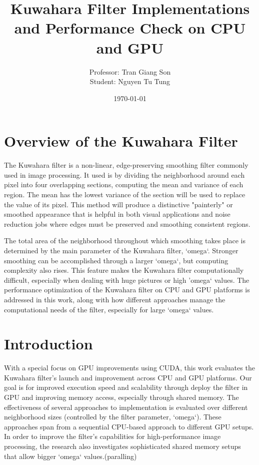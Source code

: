 \documentclass{article}
\title{Kuwahara Filter Implementations and Performance Check on CPU and GPU}
\author{
Professor: Tran Giang Son
\\
Student: Nguyen Tu Tung}
\date{\today}
\begin{document}
\maketitle

\section{Overview of the Kuwahara Filter}
The Kuwahara filter is a non-linear, edge-preserving smoothing filter commonly used in image processing. It used is by dividing the neighborhood around each pixel into four overlapping sections, computing the mean and variance of each region. The mean has the lowest variance of the section will be used to replace the value of its pixel. This method will produce a distinctive "painterly" or smoothed appearance that is helpful in both visual applications and noise reduction jobs where edges must be preserved and smoothing consistent regions.

The total area of the neighborhood throughout which smoothing takes place is determined by the main parameter of the Kuwahara filter, `omega`. Stronger smoothing can be accomplished through a larger `omega`, but computing complexity also rises. This feature makes the Kuwahara filter computationally difficult, especially when dealing with huge pictures or high 'omega` values. The performance optimization of the Kuwahara filter on CPU and GPU platforms is addressed in this work, along with how different approaches manage the computational needs of the filter, especially for large `omega` values.

\section{Introduction}
With a special focus on GPU improvements using CUDA, this work evaluates the Kuwahara filter's launch and improvement across CPU and GPU platforms. Our goal is for improved execution speed and scalability through deploy the filter in GPU and improving memory access, especially through shared memory. The effectiveness of several approaches to implementation is evaluated over different neighborhood sizes (controlled by the filter parameter, `omega`). These approaches span from a sequential CPU-based approach to different GPU setups. In order to improve the filter's capabilities for high-performance image processing, the research also investigates sophisticated shared memory setups that allow bigger `omega` values.(paralling)
\end{document}

